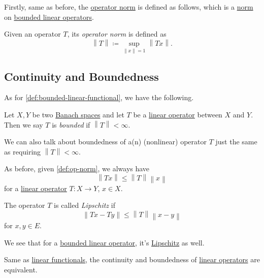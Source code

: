 Firstly, same as before, the \hyperref[def:op-norm]{operator norm} is defined as follows, which is a \hyperref[def:norm]{norm} on \hyperref[def:bounded-linear-op]{bounded linear operators}.

\begin{definition}\label{def:op-norm}
	Given an operator \(T\), its \emph{operator norm} is defined as
	\[
		\left\lVert T\right\rVert \coloneqq \sup _{\left\lVert x\right\rVert = 1} \left\lVert Tx\right\rVert.
	\]
\end{definition}

\subsection{Continuity and Boundedness}
As for \autoref{def:bounded-linear-functional}, we have the following.
\begin{definition*}\label{def:bounded-linear-op}
	Let \(X, Y\) be two \hyperref[def:Banach-space]{Banach spaces} and let \(T\) be a \hyperref[def:linear-op]{linear operator} between \(X\) and \(Y\). Then we say \(T\) is \emph{bounded} if \(\left\lVert T\right\rVert < \infty \).
\end{definition*}

\begin{remark}\label{rmk:bounded-op}
	We can also talk about boundedness of a(n) (nonlinear) operator \(T\) just the same as requiring \(\left\lVert T\right\rVert < \infty \).
\end{remark}

As before, given \autoref{def:op-norm}, we always have
\[
	\left\lVert Tx\right\rVert \leq \left\lVert T\right\rVert \left\lVert x\right\rVert
\]
for a \hyperref[def:linear-op]{linear operator} \(T\colon X\to Y\), \(x\in X\).

\begin{definition}[Lipschitz]\label{def:Lipschitz}
	The operator \(T\) is called \emph{Lipschitz} if
	\[
		\left\lVert Tx - Ty\right\rVert \leq \left\lVert T\right\rVert \left\lVert x - y\right\rVert
	\]
	for \(x, y\in E\).
\end{definition}

We see that for a \hyperref[def:bounded-linear-op]{bounded linear operator}, it's \hyperref[def:Lipschitz]{Lipschitz} as well.

\begin{remark}
	Same as \hyperref[def:linear-functional]{linear functionals}, the continuity and boundedness of \hyperref[def:linear-op]{linear operators} are equivalent.
\end{remark}

